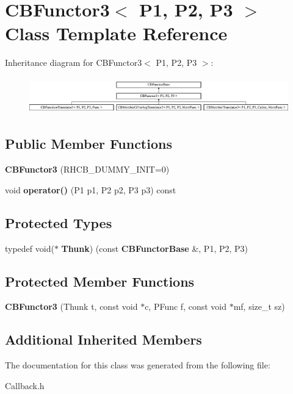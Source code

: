 \section{C\+B\+Functor3$<$ P1, P2, P3 $>$ Class Template Reference}
\label{classCBFunctor3}
Inheritance diagram for C\+B\+Functor3$<$ P1, P2, P3 $>$\+:\begin{figure}[H]
\begin{center}
\leavevmode
\includegraphics[height=1.600000cm]{classCBFunctor3}
\end{center}
\end{figure}
\subsection*{Public Member Functions}
\begin{DoxyCompactItemize}
\item 
{\bfseries C\+B\+Functor3} (R\+H\+C\+B\+\_\+\+D\+U\+M\+M\+Y\+\_\+\+I\+N\+IT=0)\label{classCBFunctor3_a45aabe3aa7d80c6d9b8fa5bec4d892f4}

\item 
void {\bfseries operator()} (P1 p1, P2 p2, P3 p3) const \label{classCBFunctor3_a716caade0cfc26f54604c2417fa0ce1f}

\end{DoxyCompactItemize}
\subsection*{Protected Types}
\begin{DoxyCompactItemize}
\item 
typedef void($\ast$ {\bfseries Thunk}) (const {\bf C\+B\+Functor\+Base} \&, P1, P2, P3)\label{classCBFunctor3_acfad242f124c1c40f0fbe769ec19a745}

\end{DoxyCompactItemize}
\subsection*{Protected Member Functions}
\begin{DoxyCompactItemize}
\item 
{\bfseries C\+B\+Functor3} (Thunk t, const void $\ast$c, P\+Func f, const void $\ast$mf, size\+\_\+t sz)\label{classCBFunctor3_a43d500e453926d91d935ff813bbfb7f2}

\end{DoxyCompactItemize}
\subsection*{Additional Inherited Members}


The documentation for this class was generated from the following file\+:\begin{DoxyCompactItemize}
\item 
Callback.\+h\end{DoxyCompactItemize}
